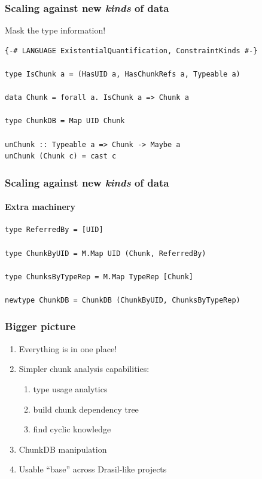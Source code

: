 \documentclass[xcolor={dvipsnames}]{beamer}
\begin{document}
\begin{frame}[fragile]
  \frametitle{Scaling against new \textit{kinds} of data}

  \begin{center}
    Mask the type information!
  \end{center}

\begin{verbatim}
{-# LANGUAGE ExistentialQuantification, ConstraintKinds #-}

type IsChunk a = (HasUID a, HasChunkRefs a, Typeable a)

data Chunk = forall a. IsChunk a => Chunk a

type ChunkDB = Map UID Chunk

unChunk :: Typeable a => Chunk -> Maybe a
unChunk (Chunk c) = cast c
\end{verbatim}
\end{frame}

\begin{frame}[fragile]
  \frametitle{Scaling against new \textit{kinds} of data}
  \framesubtitle{Extra machinery}

\begin{verbatim}
type ReferredBy = [UID]

type ChunkByUID = M.Map UID (Chunk, ReferredBy)

type ChunksByTypeRep = M.Map TypeRep [Chunk]

newtype ChunkDB = ChunkDB (ChunkByUID, ChunksByTypeRep)
\end{verbatim}
\end{frame}

\begin{frame}
  \frametitle{Bigger picture}

  \begin{enumerate}
    \item Everything is in one place!
    \item Simpler chunk analysis capabilities:
      \begin{enumerate}
        \item type usage analytics
        \item build chunk dependency tree
        \item find cyclic knowledge
      \end{enumerate}
    \item ChunkDB manipulation
    \item Usable ``base'' across Drasil-like projects
  \end{enumerate}
\end{frame}
\end{document}

